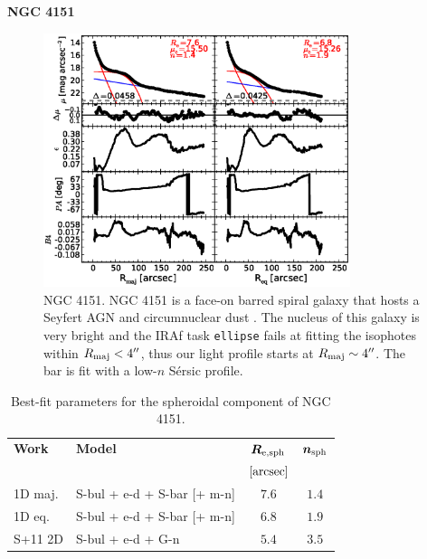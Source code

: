 \documentclass[preprint2]{emulateapj}
\newcommand{\fitfigurewidth}{0.8\textwidth}
\begin{document}
  \clearpage\newpage\noindent
  {\bf NGC 4151 \\}

  \begin{figure}[h]
  \begin{center}
  \includegraphics[width=\fitfigurewidth]{images/n4151_1Dfit.eps}
  \caption{NGC 4151.
  NGC 4151 is a face-on barred spiral galaxy that hosts a Seyfert AGN \citep{veroncettyveron2006} 
  and circumnuclear dust \citep{pott2010}.
  The nucleus of this galaxy is very bright and the IRAf task {\tt ellipse} fails at fitting the isophotes within $R_{\rm maj} < 4''$, 
  thus our light profile starts at $R_{\rm maj} \sim 4''$. 
  The bar is fit with a low-$n$ S\'ersic profile.  
  }
  \end{center}
  \end{figure}

  \begin{table}[h]
  \small
  \caption{Best-fit parameters for the spheroidal component of NGC 4151.}
  \begin{center}
  \begin{tabular}{llcc}
  \hline
  {\bf Work} & {\bf Model}   & $\bm R_{\rm e,sph}$    & $\bm n_{\rm sph}$ \\
    &  &  $[\rm arcsec]$ & \\
  \hline
  1D maj. & S-bul + e-d + S-bar [+ m-n] & $7.6$  &  $1.4$ \\
  1D eq.  & S-bul + e-d + S-bar [+ m-n] & $6.8$  &  $1.9$ \\
  \hline
  S+11 2D         & S-bul + e-d + G-n         & $5.4$  &  $3.5$ \\
  \hline
  \end{tabular}
  \end{center}
  \label{tab:n4151}
  \end{table}
\end{document}
